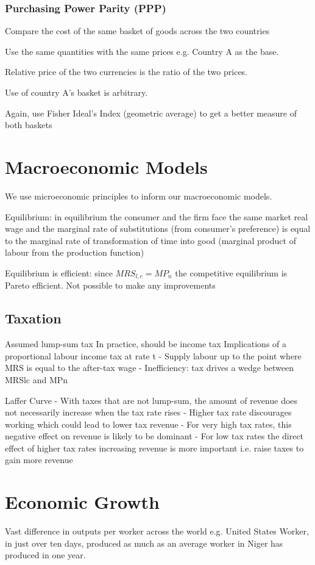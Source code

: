\documentclass[12pt, letterpaper]{article}
\begin{document}
{\subsubsection{Purchasing Power Parity (PPP)}
Compare the cost of the same basket of goods across the two countries

Use the same quantities with the same prices e.g. Country A as the base.

Relative price of the two currencies is the ratio of the two prices.

Use of country A's basket is arbitrary.

Again, use Fisher Ideal's Index (geometric average) to get a better measure of both baskets


\section{Macroeconomic Models}
We use microeconomic principles to inform our macroeconomic models.

Equilibrium: in equilibrium the consumer and the firm face the same market real wage and the marginal rate of substitutions (from consumer's preference) is equal to the marginal rate of transformation of time into good (marginal product of labour from the production function)

Equilibrium is efficient: since $MRS_{l,c} = MP_n$ the competitive equilibrium is Pareto efficient. Not possible to make any improvements

\subsection{Taxation}
Assumed lump-sum tax
In practice, should be income tax
Implications of a proportional labour income tax at rate t
- Supply labour up to the point where MRS is equal to the after-tax wage
- Inefficiency: tax drives a wedge between MRSlc and MPn 

Laffer Curve
- With taxes that are not lump-sum, the amount of revenue does not necessarily increase when the tax rate rises
- Higher tax rate discourages working which could lead to lower tax revenue
- For very high tax rates, this negative effect on revenue is likely to be dominant
- For low tax rates the direct effect of higher tax rates increasing revenue is more important i.e. raise taxes to gain more revenue


\section{Economic Growth}
Vast difference in outputs per worker across the world e.g. United States Worker, in just over ten days, produced as much as an average worker in Niger has produced in one year.

}
\end{document}
